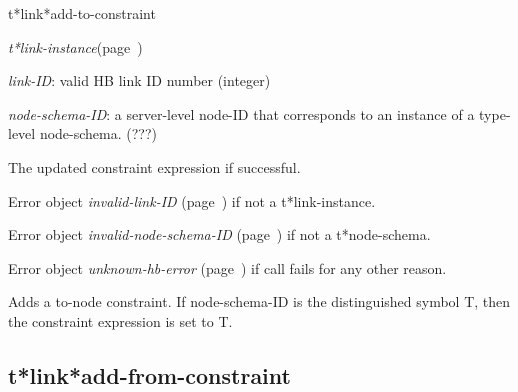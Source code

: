 \begin{description}
\item [Name:]  t*link*add-to-constraint

\item [Class:] {\sl t*link-instance}\hfill(page~\pageref{t*link-instance})

\item [Parameters:]
\item {\sl link-ID}:  
valid HB link ID number (integer)

\item {\sl node-schema-ID}:  a server-level node-ID that corresponds to an 
instance of a type-level node-schema. (???)



\item [Return-value:]
The updated constraint expression if successful.

Error object {\sl invalid-link-ID} (page~\pageref{invalid-link-ID}) if not a t*link-instance.

Error object {\sl invalid-node-schema-ID} (page~\pageref{invalid-node-schema-ID}) if not a
t*node-schema.

Error object {\sl unknown-hb-error} (page~\pageref{unknown-hb-error}) if call fails for
any other reason.

\item [Description:]

Adds a to-node constraint. If node-schema-ID is the
distinguished symbol T, then the constraint expression
is set to T.

\item [Public:]



\end{description}
\horizontalline

\subsection{t*link*add-from-constraint}
\label{t*link*add-from-constraint}

